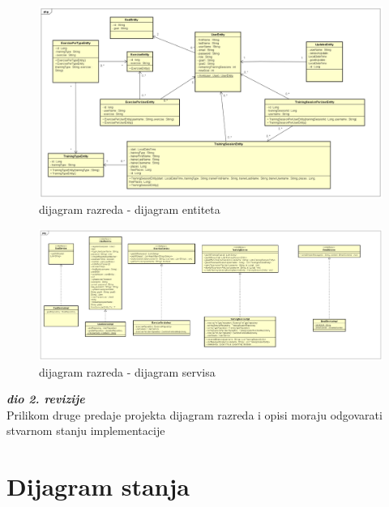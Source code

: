 {{{{{{		
			\begin{figure}[H]
				\includegraphics[scale=0.3]{dijagrami/EntitiesFinalVersion.png} %
				\centering
				\caption{dijagram razreda - dijagram entiteta}
				\label{fig:diagramRAZ4}
			\end{figure}
		
			\begin{figure}[H]
				\includegraphics[scale=0.2]{dijagrami/servicesFinalVersion.png} %
				\centering
				\caption{dijagram razreda - dijagram servisa}
				\label{fig:diagramRAZ5}
			\end{figure}

		
		
			\textbf{\textit{dio 2. revizije}}\\			
			
			{Prilikom druge predaje projekta dijagram razreda i opisi moraju odgovarati stvarnom stanju implementacije}
			
			
			
			\eject
		
		\section{Dijagram stanja}
			
}}}}}}
